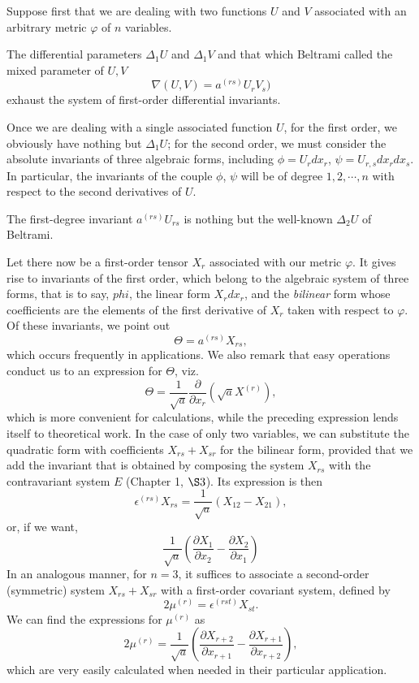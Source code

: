\documentclass{book}
\begin{document}
Suppose first that we are dealing with two functions $U$ and $V$ associated with an arbitrary metric $\varphi$ of $n$ variables.

The differential parameters $\Delta_1 U$ and $\Delta_1 V$ and that which Beltrami called the mixed parameter of $U,V$
$$\nabla(U,V)=a^{(rs)}U_rV_s)$$
exhaust the system of first-order differential invariants. 

Once we are dealing with a single associated function $U$, for the first order, we obviously have nothing but $\Delta_1 U$; for the second order, we must consider the absolute invariants of three algebraic forms, including $\phi=U_rdx_r$, $\psi=U_{r,s}dx_rdx_s.$ In particular, the invariants of the couple $\phi$, $\psi$ will be of degree $1,2,\cdots,n$ with respect to the second derivatives of $U$. 

The first-degree invariant $a^{(rs)}U_{rs}$ is nothing but the well-known $\Delta_2 U$ of Beltrami. 

Let there now be a first-order tensor $X_r$ associated with our metric $\varphi$. It gives rise to invariants of the 	first order, which belong to the algebraic system of three forms, that is to say, $phi$, the linear form $X_rdx_r$, and the \emph{bilinear} form whose coefficients are the elements of the first derivative of $X_r$ taken with respect to $\varphi$. Of these invariants, we point out
$$\Theta=a^{(rs)}X_{rs},$$
which occurs frequently in applications. We also remark that easy operations conduct us to an expression for $\Theta$, viz.
$$\Theta=\frac{1}{\sqrt{a}}\frac{\partial}{\partial x_r}(\sqrt{a}X^{(r)}),$$
which is more convenient for calculations, while the preceding expression lends itself to theoretical work. In the case of only two variables, we can substitute the quadratic form with coefficients $X_{rs}+X_{sr}$ for the bilinear form, provided that we add the invariant that is obtained by composing the system $X_{rs}$ with the contravariant system $E$ (Chapter 1, $\S3$). Its expression is then
$$\epsilon^{(rs)}X_{rs}=\frac{1}{\sqrt{a}}(X_{12}-X_{21}),$$
or, if we want,
$$\frac{1}{\sqrt{a}}\left(\frac{\partial X_1}{\partial x_2}-\frac{\partial X_2}{\partial x_1}\right)$$
In an analogous manner, for $n=3$, it suffices to associate a second-order (symmetric) system $X_{rs}+X_{sr}$ with a first-order covariant system, defined by
$$2\mu^{(r)}=\epsilon^{(rst)}X_{st}.$$
We can find the expressions for $\mu^{(r)}$ as
$$2\mu^{(r)}=\frac{1}{\sqrt{a}}\left(\frac{\partial X_{r+2}}{\partial x_{r+1}}-\frac{\partial X_{r+1}}{\partial x_{r+2}}\right),$$
which are very easily calculated when needed in their particular application. 
\end{document}
